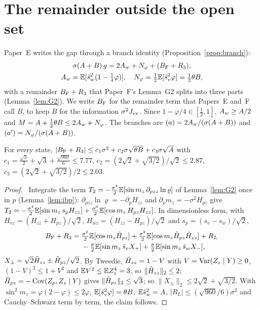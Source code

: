 \section{The remainder outside the open set}
\label{sec:outside}

Paper~E writes the gap through a branch identity (Proposition~\ref{prop:branch}):
\begin{equation}
\begin{gathered}
\sigma(A+B)\,g=2A_w+N_\varphi+(B_{\mathrm F}+R_3),\\ A_w=\mathbb{E}[\tilde s_w^2(1-\tfrac14\varphi)],\quad N_\varphi=\tfrac12\mathbb{E}[\tilde s_v^2\varphi]=\tfrac12\theta B ,
\end{gathered}
\label{eq:branch}
\end{equation}
with a remainder $B_{\mathrm F}+R_3$ that Paper~F's Lemma~G2 splits into three parts (Lemma~\ref{lem:G2}).
We write $B_{\mathrm F}$ for the remainder term that Papers~E and~F call $B$, to keep $B$ for the information $\sigma^2J_{vv}$.
Since $1-\varphi/4\in[\frac12,1]$, $A_w\ge A/2$ and $M=A+\frac12\theta B\le2A_w+N_\varphi$.
The branches are $(a)=2A_w/(\sigma(A+B))$ and $(a')=N_\varphi/(\sigma(A+B))$.

\begin{lemma}[Numerator]\label{lem:EF1}
For every state, $|B_{\mathrm F}+R_3|\le c_1\sigma^2+c_2\sigma\sqrt{\theta B}+c_3\sigma\sqrt A$ with
$c_1=\frac{\sqrt3}2+\sqrt3+\frac{\sqrt{960}}6\le7.77$, $c_2=(2\sqrt2+\sqrt{3/2})/\sqrt2\le2.87$, $c_3=(2\sqrt2+\sqrt{3/2})/2\le2.03$.
\end{lemma}
\begin{proof}\proofst\
Integrate the term $T_2=-\frac{\sigma^4}2\mathbb{E}[\sin m_z\,\partial_{pzz}\ln\varrho]$ of Lemma~\ref{lem:G2} once in $p$ (Lemma~\ref{lem:ibp}): $\partial_{pzz}\ln\varrho=-\partial_pH_{zz}$ and $\partial_pm_z=-\sigma^2H_{pz}$ give $T_2=-\frac{\sigma^4}2\mathbb{E}[\sin m_z\,s_pH_{zz}]+\frac{\sigma^6}2\mathbb{E}[\cos m_z\,H_{pz}H_{zz}]$.
In dimensionless form, with $H_{vz}=(H_{zz}+H_{pz})/\sqrt2$, $H_{wz}=(H_{zz}-H_{pz})/\sqrt2$ and $s_p=(s_v-s_w)/\sqrt2$,
\[
\begin{aligned}
B_{\mathrm F}+R_3={}&\tfrac{\sigma^2}2\mathbb{E}[\cos m_z\tilde H_{pz}]+\tfrac{\sigma^2}2\mathbb{E}[\cos m_z\tilde H_{pz}\tilde H_{zz}]+R_L\\ &-\tfrac\sigma2\mathbb{E}[\sin m_z\,\tilde s_vX_+]+\tfrac\sigma2\mathbb{E}[\sin m_z\,\tilde s_wX_-],
\end{aligned}
\]
$X_\pm=\sqrt2\tilde H_{zz}\pm\tilde H_{pz}/\sqrt2$.
By Tweedie, $\tilde H_{zz}=1-V$ with $V=\operatorname{Var}(Z_z\mid Y)\ge0$, $(1-V)^2\le1+V^2$ and $\mathbb{E} V^2\le\mathbb{E} Z_z^4=3$, so $\|\tilde H_{zz}\|_2\le2$; $\tilde H_{pz}=-\operatorname{Cov}(Z_p,Z_z\mid Y)$ gives $\|\tilde H_{pz}\|_2\le\sqrt3$; so $\|X_\pm\|_2\le2\sqrt2+\sqrt{3/2}$.
With $\sin^2m_z=\varphi(2-\varphi)\le2\varphi$, $\mathbb{E}[\tilde s_v^2\varphi]=\theta B$, $\mathbb{E}\tilde s_w^2=A$, $|R_L|\le(\sqrt{960}/6)\sigma^2$ and Cauchy--Schwarz term by term, the claim follows.
\end{proof}


